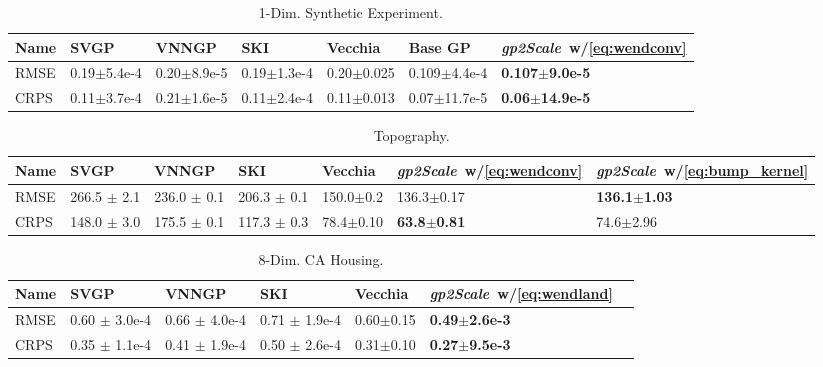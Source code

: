 \documentclass{article}
\begin{document}
\begin{table}[t]
  \caption{1-Dim. Synthetic Experiment.}
  \label{tbl:1d}
  \label{1d}
  \centering
  \begin{tabular}{lllllll}
    \toprule
    Name            & SVGP     & VNNGP & SKI & Vecchia & Base GP & \emph{gp2Scale}~w/\eqref{eq:wendconv} \\
    \midrule
    RMSE         &  0.19$\pm$5.4e-4 &  0.20$\pm$8.9e-5 & 0.19$\pm$1.3e-4  & 0.20$\pm$0.025 &  0.109$\pm$4.4e-4 & \textbf{0.107$\pm$9.0e-5} \\
    CRPS         &  0.11$\pm$3.7e-4 &  0.21$\pm$1.6e-5 & 0.11$\pm$2.4e-4  & 0.11$\pm$0.013  &  0.07$\pm$11.7e-5 & \textbf{0.06$\pm$14.9e-5}  \\
    \bottomrule
  \end{tabular}
\end{table}
\begin{table}[t]
  \caption{Topography.}
  \label{tbl:topo}
  \centering
  \begin{tabular}{lllllll}
    \toprule
    Name            & SVGP     & VNNGP & SKI&Vecchia&\emph{gp2Scale}~w/\eqref{eq:wendconv}&\emph{gp2Scale}~w/\eqref{eq:bump_kernel}\\
    \midrule
    RMSE            &  266.5 $\pm$ 2.1 &  236.0 $\pm$ 0.1 & 206.3 $\pm$ 0.1  & 150.0$\pm$0.2 & 136.3$\pm$0.17 & \textbf{136.1$\pm$1.03}\\
    CRPS            &  148.0 $\pm$ 3.0 &  175.5 $\pm$ 0.1 & 117.3 $\pm$ 0.3  & 78.4$\pm$0.10 & \textbf{63.8$\pm$0.81}  & 74.6$\pm$2.96\\
    \bottomrule
  \end{tabular}
\end{table}
\begin{table}[t]
  \caption{8-Dim. CA Housing.}
  \label{tbl:ca}
  \centering
  \begin{tabular}{lllllll}
    \toprule
    Name            & SVGP     & VNNGP & SKI & Vecchia & \emph{gp2Scale}~w/\eqref{eq:wendland} \\
    \midrule
    RMSE            &  0.60 $\pm$ 3.0e-4 &  0.66 $\pm$ 4.0e-4 & 0.71 $\pm$ 1.9e-4  &   0.60$\pm$0.15 &  \textbf{0.49$\pm$2.6e-3} \\
    CRPS            &  0.35 $\pm$ 1.1e-4 &  0.41 $\pm$ 1.9e-4 & 0.50 $\pm$ 2.6e-4  &   0.31$\pm$0.10 &  \textbf{0.27$\pm$9.5e-3} \\
    \bottomrule
  \end{tabular}
\end{table}
\end{document}
